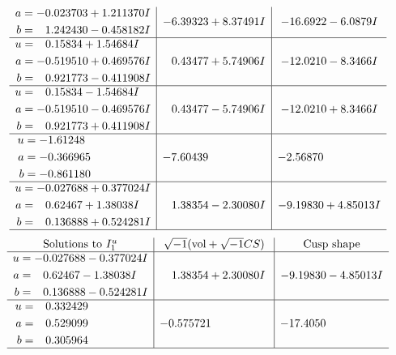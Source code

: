 \documentclass[1p]{elsarticle_modified}
\theoremstyle{definition}
\newcommand{\I}{\sqrt{-1}}
\begin{document}
$$\begin{array}{c|c|c}
\begin{aligned}
a &= -0.023703 + 1.211370 I \\
b &= \phantom{-}1.242430 - 0.458182 I\end{aligned}
 & -6.39323 + 8.37491 I & -16.6922 - 6.0879 I \\ \hline\begin{aligned}
u &= \phantom{-}0.15834 + 1.54684 I \\
a &= -0.519510 + 0.469576 I \\
b &= \phantom{-}0.921773 - 0.411908 I\end{aligned}
 & \phantom{-}0.43477 + 5.74906 I & -12.0210 - 8.3466 I \\ \hline\begin{aligned}
u &= \phantom{-}0.15834 - 1.54684 I \\
a &= -0.519510 - 0.469576 I \\
b &= \phantom{-}0.921773 + 0.411908 I\end{aligned}
 & \phantom{-}0.43477 - 5.74906 I & -12.0210 + 8.3466 I \\ \hline\begin{aligned}
u &= -1.61248\phantom{ +0.000000I} \\
a &= -0.366965\phantom{ +0.000000I} \\
b &= -0.861180\phantom{ +0.000000I}\end{aligned}
 & -7.60439\phantom{ +0.000000I} & -2.56870\phantom{ +0.000000I} \\ \hline\begin{aligned}
u &= -0.027688 + 0.377024 I \\
a &= \phantom{-}0.62467 + 1.38038 I \\
b &= \phantom{-}0.136888 + 0.524281 I\end{aligned}
 & \phantom{-}1.38354 - 2.30080 I & -9.19830 + 4.85013 I\\
 \hline 
 \end{array}$$\newpage$$\begin{array}{c|c|c}  
\text{Solutions to }I^u_{1}& \I (\text{vol} + \sqrt{-1}CS) & \text{Cusp shape}\\
 \hline 
\begin{aligned}
u &= -0.027688 - 0.377024 I \\
a &= \phantom{-}0.62467 - 1.38038 I \\
b &= \phantom{-}0.136888 - 0.524281 I\end{aligned}
 & \phantom{-}1.38354 + 2.30080 I & -9.19830 - 4.85013 I \\ \hline\begin{aligned}
u &= \phantom{-}0.332429\phantom{ +0.000000I} \\
a &= \phantom{-}0.529099\phantom{ +0.000000I} \\
b &= \phantom{-}0.305964\phantom{ +0.000000I}\end{aligned}
 & -0.575721\phantom{ +0.000000I} & -17.4050\phantom{ +0.000000I}\\
 \hline 
 \end{array}$$\newpage\newpage\renewcommand{\arraystretch}{1}
\end{document}
